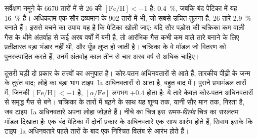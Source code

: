सर्वेक्षण नमूने के 6670 तारों में से 26 की $[\mathrm{Fe/H}] < -1$ है:
\qty{0.4}{\percent}, जबकि बंद पेटिका में यह \qty{16}{\percent} है।
अधिकतम एक सौर द्रव्यमान के 902 तारों में भी, जो सबसे उचित तुलना है,
26 तारे \qty{2.9}{\percent} बनाते हैं। इससे बचने का उपाय यह है कि
पेटिका खोली जाए: यदि सौर पड़ोस की चक्रिका कम  वाली गैस के
धीमे अंतर्वाह से कई अरब वर्षों में बनी है, तो आरंभिक गैस कभी
कम  वाले तारे बनाने के लिए प्रतीक्षारत बड़ा भंडार नहीं थी, और पूँछ
लुप्त हो जाती है। चक्रिका के वे मॉडल जो वितरण को पुनरुत्पादित करते हैं,
उनमें अंतर्वाह काल तीन से चार अरब वर्ष से अधिक चाहिए।

दूसरी घड़ी दो प्रकार के तत्त्वों का अनुपात है। 
कोर-पतन अधिनवतारों से आते हैं, तारकीय पीढ़ी के जन्म के तुरंत बाद;
लोहे का बड़ा भाग टाइप~Ia अधिनवतारों से आता है,
बहुत बाद में। पुराने प्रभामंडल तारों में, जिनकी $[\mathrm{Fe/H}] < -1$ है,
$[\alpha/\mathrm{Fe}]$ लगभग $+0.4$ होता है: ये तारे केवल कोर-पतन अधिनवतारों से
समृद्ध गैस से बने। चक्रिका के तारों में  बढ़ने के साथ यह
शून्य तक, यानी सौर मान तक, गिरता है, जब टाइप~Ia
अधिनवतारे अपना लोहा जोड़ते हैं। नीचे का चित्र इस
\emph{समय-विलंब} चित्र का सरलतम मॉडल दिखाता है: एक बंद पेटिका में दोनों प्रकार के
अधिनवतारे एक साथ आरंभ होते हैं, सिवाय इसके कि टाइप~Ia अधिनवतारे
पहले तारों के बाद एक निश्चित विलंब से आरंभ होते हैं।

